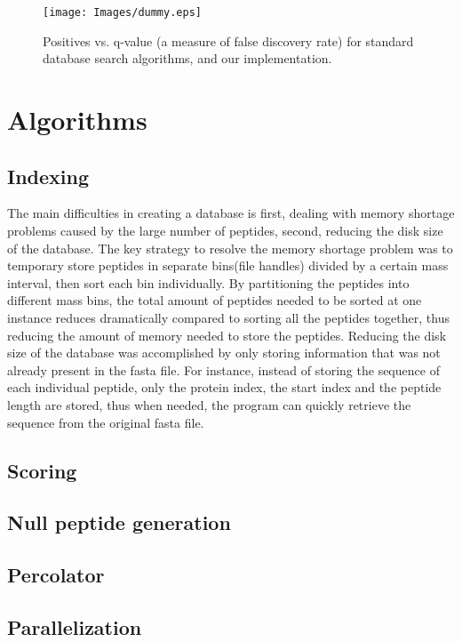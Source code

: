 \documentclass{bioinfo}
\begin{document}
\begin{figure}
  \centering
  \texttt{[image: Images/dummy.eps]}
  \caption{Positives vs. q-value (a measure of false discovery rate) for
  standard database search algorithms, and our implementation.}
  \label{figure:indexing}
\end{figure}



\section{Algorithms}

\subsection*{Indexing}
The main difficulties in creating a database is first, dealing with memory shortage problems caused by the large number of peptides, 
second, reducing the disk size of the database. The key strategy to resolve the memory shortage problem was to temporary store peptides 
in separate bins(file handles) divided by a certain mass interval, then sort each bin individually. By partitioning the peptides into different mass bins, the total amount of peptides needed to be sorted at one instance reduces dramatically compared to sorting all the peptides together, thus reducing the amount of memory needed to store the peptides. Reducing the disk size of the database was accomplished by only storing information that was not already present in the fasta file. For instance, instead of storing the sequence of each individual peptide, only the protein index, the start index and the peptide length are stored, thus when needed, the program can quickly retrieve the sequence from the original fasta file.
\subsection*{Scoring}
\subsection*{Null peptide generation}
\subsection*{Percolator}
\subsection*{Parallelization}
\end{document}
